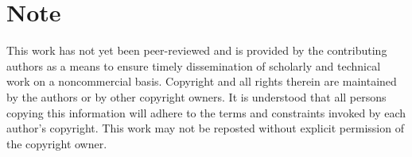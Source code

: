 \documentclass[12pt,a4paper]{article}
\theoremstyle{definition}
\begin{document}
\section*{Note}

This work has not yet been peer-reviewed and is provided by the contributing authors as a means to ensure timely dissemination of scholarly and technical work on a noncommercial basis. Copyright and all rights therein are maintained by the authors or by other copyright owners. It is understood that all persons copying this information will adhere to the terms and constraints invoked by each author's copyright. This work may not be reposted without explicit permission of the copyright owner.




\end{document}
